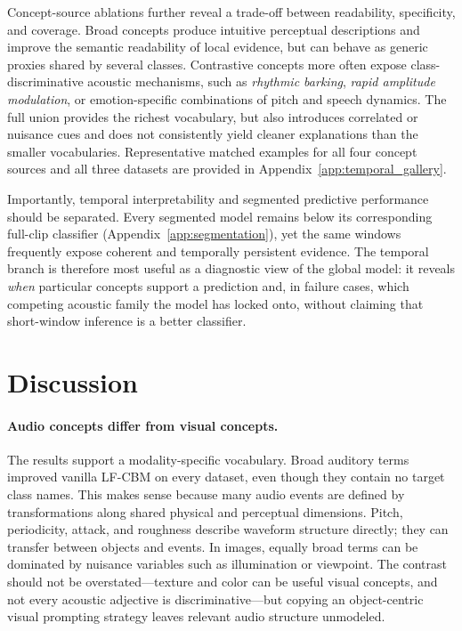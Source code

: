\documentclass[10pt]{article}
\begin{document}
Concept-source ablations further reveal a trade-off between readability, specificity, and coverage. Broad concepts produce intuitive perceptual descriptions and improve the semantic readability of local evidence, but can behave as generic proxies shared by several classes. Contrastive concepts more often expose class-discriminative acoustic mechanisms, such as \emph{rhythmic barking}, \emph{rapid amplitude modulation}, or emotion-specific combinations of pitch and speech dynamics. The full union provides the richest vocabulary, but also introduces correlated or nuisance cues and does not consistently yield cleaner explanations than the smaller vocabularies. Representative matched examples for all four concept sources and all three datasets are provided in Appendix~\ref{app:temporal_gallery}.

Importantly, temporal interpretability and segmented predictive performance should be separated. Every segmented model remains below its corresponding full-clip classifier (Appendix~\ref{app:segmentation}), yet the same windows frequently expose coherent and temporally persistent evidence. The temporal branch is therefore most useful as a diagnostic view of the global model: it reveals \emph{when} particular concepts support a prediction and, in failure cases, which competing acoustic family the model has locked onto, without claiming that short-window inference is a better classifier.

\section{Discussion}
\paragraph{Audio concepts differ from visual concepts.}
The results support a modality-specific vocabulary. Broad auditory terms improved vanilla LF-CBM on every dataset, even though they contain no target class names. This makes sense because many audio events are defined by transformations along shared physical and perceptual dimensions. Pitch, periodicity, attack, and roughness describe waveform structure directly; they can transfer between objects and events. In images, equally broad terms can be dominated by nuisance variables such as illumination or viewpoint. The contrast should not be overstated---texture and color can be useful visual concepts, and not every acoustic adjective is discriminative---but copying an object-centric visual prompting strategy leaves relevant audio structure unmodeled.
\end{document}

